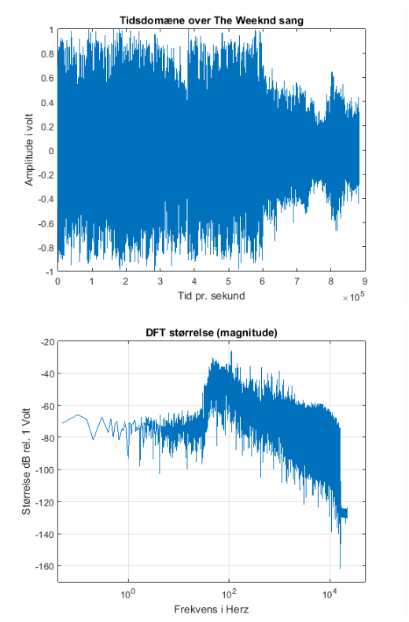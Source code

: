 \documentclass[12pt, letterpaper]{article}
\begin{document}
\begin{center}
\includegraphics[width=\textwidth]{billeder/weekndtid}
\end{center}

\begin{center}
\includegraphics[width=\textwidth]{billeder/weekndstorrelse}
\end{center}
\end{document}

